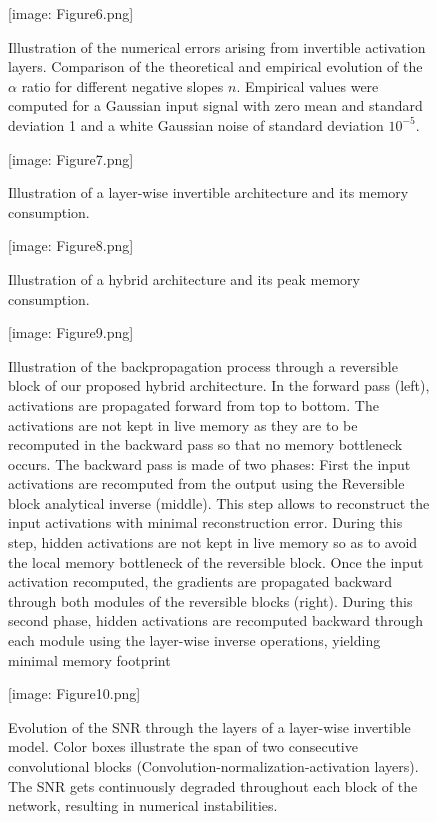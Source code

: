 \documentclass[twocolumn]{bmcart}
\def\texttt{[image: ]}
\begin{document}
\begin{backmatter}
\begin{figure}[t]
\texttt{[image: Figure6.png]}
\caption{
Illustration of the numerical errors arising from invertible activation layers.
Comparison of the theoretical and empirical evolution of the $\alpha$ ratio for different negative slopes $n$.
Empirical values were computed for a Gaussian input signal with zero mean and standard deviation 1 and a white Gaussian noise of standard deviation $10^{-5}$.
}
\end{figure}
\begin{figure}[t]
\texttt{[image: Figure7.png]}
\caption{
Illustration of a layer-wise invertible architecture and its memory consumption. 
}
\end{figure}

\begin{figure}[t]
\texttt{[image: Figure8.png]}
\caption{
Illustration of a hybrid architecture and its peak memory consumption. 
}
\end{figure}

\begin{figure}[t]
\texttt{[image: Figure9.png]}
\caption{
Illustration of the backpropagation process through a reversible block of our proposed hybrid architecture.
In the forward pass (left), activations are propagated forward from top to bottom.
The activations are not kept in live memory as they are to be recomputed in the backward pass so that no memory bottleneck occurs.
The backward pass is made of two phases: 
First the input activations are recomputed from the output using the Reversible block analytical inverse (middle).
This step allows to reconstruct the input activations with minimal reconstruction error.
During this step, hidden activations are not kept in live memory so as to avoid the local memory bottleneck of the reversible block.
Once the input activation recomputed, the gradients are propagated backward through both modules of the reversible blocks (right).
During this second phase, hidden activations are recomputed backward through each module using the layer-wise inverse operations, yielding minimal memory footprint
}
\end{figure}


\begin{figure}[t]
\texttt{[image: Figure10.png]}
\caption{
Evolution of the SNR through the layers of a layer-wise invertible model.
Color boxes illustrate the span of two consecutive convolutional blocks (Convolution-normalization-activation layers).
The SNR gets continuously degraded throughout each block of the network, resulting in numerical instabilities.
}
\end{figure}


\end{backmatter}
\end{document}
